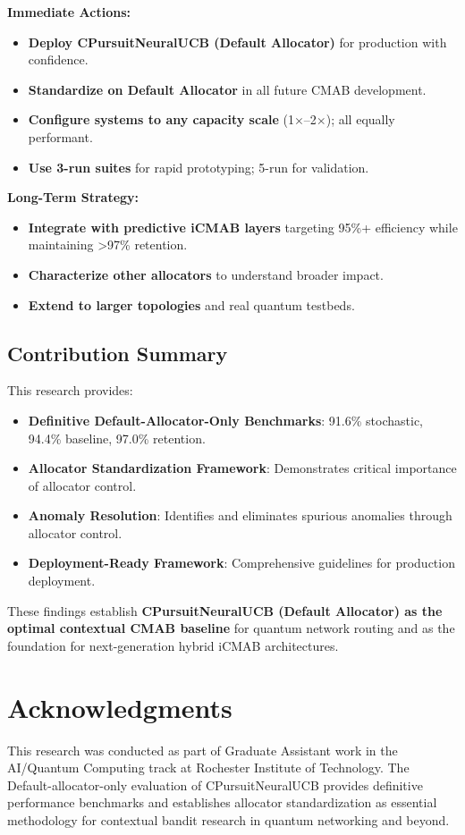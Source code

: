 \documentclass[12pt,a4paper]{article}
\newcommand{\success}[1]{\textcolor{accentgreen}{\textbf{#1}}}
\begin{document}
\textbf{Immediate Actions:}
\begin{itemize}
    \item \success{Deploy CPursuitNeuralUCB (Default Allocator)} for production with confidence.
    \item \success{Standardize on Default Allocator} in all future CMAB development.
    \item \success{Configure systems to any capacity scale} (1$\times$--2$\times$); all equally performant.
    \item \success{Use 3-run suites} for rapid prototyping; 5-run for validation.
\end{itemize}

\textbf{Long-Term Strategy:}
\begin{itemize}
    \item \success{Integrate with predictive iCMAB layers} targeting 95\%+ efficiency while maintaining >97\% retention.
    \item \success{Characterize other allocators} to understand broader impact.
    \item \success{Extend to larger topologies} and real quantum testbeds.
\end{itemize}

\subsection{Contribution Summary}

This research provides:

\begin{itemize}
    \item \success{\textbf{Definitive Default-Allocator-Only Benchmarks}}: 91.6\% stochastic, 94.4\% baseline, 97.0\% retention.
    
    \item \success{\textbf{Allocator Standardization Framework}}: Demonstrates critical importance of allocator control.
    
    \item \success{\textbf{Anomaly Resolution}}: Identifies and eliminates spurious anomalies through allocator control.
    
    \item \success{\textbf{Deployment-Ready Framework}}: Comprehensive guidelines for production deployment.
\end{itemize}

These findings establish \success{\textbf{CPursuitNeuralUCB (Default Allocator) as the optimal contextual CMAB baseline}} for quantum network routing and as the foundation for next-generation hybrid iCMAB architectures.

\section{Acknowledgments}

This research was conducted as part of Graduate Assistant work in the AI/Quantum Computing track at Rochester Institute of Technology. The Default-allocator-only evaluation of CPursuitNeuralUCB provides definitive performance benchmarks and establishes allocator standardization as essential methodology for contextual bandit research in quantum networking and beyond.
\end{document}
